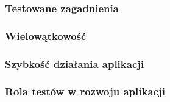 \subsubsection{Testowane zagadnienia}

\subsubsection{Wielowątkowość}

\subsubsection{Szybkość działania aplikacji}

\subsubsection{Rola testów w rozwoju aplikacji}
